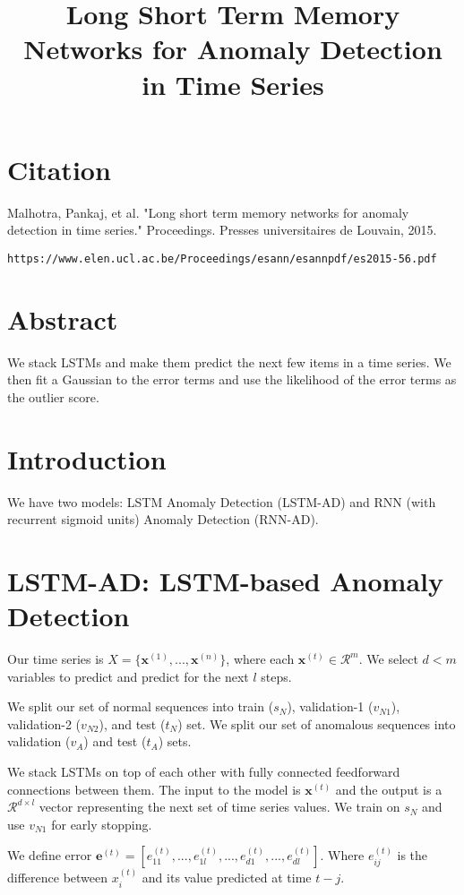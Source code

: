 \documentclass[a4paper]{article}
\title{Long Short Term Memory Networks for Anomaly Detection in Time Series}
\date{}
\begin{document}
\maketitle

\section{Citation}
Malhotra, Pankaj, et al. "Long short term memory networks for anomaly detection in time series." Proceedings. Presses universitaires de Louvain, 2015.

\begin{verbatim}
https://www.elen.ucl.ac.be/Proceedings/esann/esannpdf/es2015-56.pdf
\end{verbatim}

\section{Abstract}
We stack LSTMs and make them predict the next few items in a time series.
We then fit a Gaussian to the error terms and use the likelihood of the
error terms as the outlier score.

\section{Introduction}
We have two models: LSTM Anomaly Detection (LSTM-AD) and RNN (with
recurrent sigmoid units) Anomaly Detection (RNN-AD).

\section{LSTM-AD: LSTM-based Anomaly Detection}
Our time series is $X = \{\mathbf{x}^{(1)}, ..., \mathbf{x}^{(n)}\}$, where
each $\mathbf{x}^{(t)} \in \mathcal{R}^{m}$. We select $d < m$ variables to
predict and predict for the next $l$ steps.

We split our set of normal sequences into train ($s_N$), validation-1
($v_{N1}$), validation-2 ($v_{N2}$), and test ($t_N$) set. We split our set of
anomalous sequences into validation ($v_A$) and test ($t_A$) sets.

We stack LSTMs on top of each other with fully connected feedforward connections
between them. The input to the model is $\mathbf{x}^{(t)}$ and the output is
a $\mathcal{R}^{d \times l}$ vector representing the next set of time series
values. We train on $s_N$ and use $v_{N1}$ for early stopping.

We define error $\mathbf{e}^{(t)} = [e_{11}^{(t)}, ..., e_{1l}^{(t)}, ...,
e_{d1}^{(t)}, ..., e_{dl}^{(t)}]$. Where $e_{ij}^{(t)}$ is the difference
between $x_i^{(t)}$ and its value predicted at time $t - j$.
\end{document}

